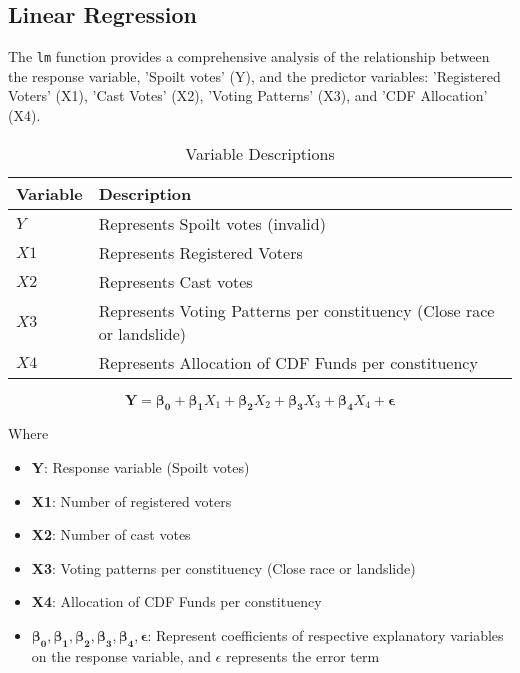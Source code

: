 \documentclass[fleqn,a4paper,12pt]{article}
\begin{document}
\subsection{Linear Regression}


The \texttt{lm} function provides a comprehensive analysis of the relationship between the response variable, 'Spoilt votes' (Y), and the predictor variables: 'Registered Voters' (X1), 'Cast Votes' (X2), 'Voting Patterns' (X3), and 'CDF Allocation' (X4).

\begin{table}[htb] %
  \centering
  \small
  \begin{tabular}{|p{}|p{}|}
    \hline
    \textbf{Variable} & \textbf{Description} \\
    \hline
    $Y$ & Represents Spoilt votes (invalid) \\
    \hline
    $X1$ & Represents Registered Voters \\
    \hline
    $X2$ & Represents Cast votes \\
    \hline
    $X3$ & Represents Voting Patterns per constituency (Close race or landslide) \\
    \hline
    $X4$ & Represents Allocation of CDF Funds per constituency \\
    \hline
  \end{tabular}
  \caption{Variable Descriptions}
\end{table}

\newpage
\[
\bm{Y} = \bm{\beta_0} + \bm{\beta_1}X_1 + \bm{\beta_2}X_2 + \bm{\beta_3}X_3 + \bm{\beta_4}X_4 + \bm{\epsilon}
\]


Where

\begin{itemize}
  \item \textbf{Y}: Response variable (Spoilt votes)
  \item \textbf{X1}: Number of registered voters
  \item \textbf{X2}: Number of cast votes
  \item \textbf{X3}: Voting patterns per constituency (Close race or landslide)
  \item \textbf{X4}: Allocation of CDF Funds per constituency
  \item \textbf{$\bm{\beta_0},  \bm{\beta_1},  \bm{\beta_2},  \bm{\beta_3},  \bm{\beta_4}, \bm{\epsilon}$}: Represent coefficients of respective explanatory variables on the response variable, and $\epsilon$ represents the error term
\end{itemize}
\end{document}
